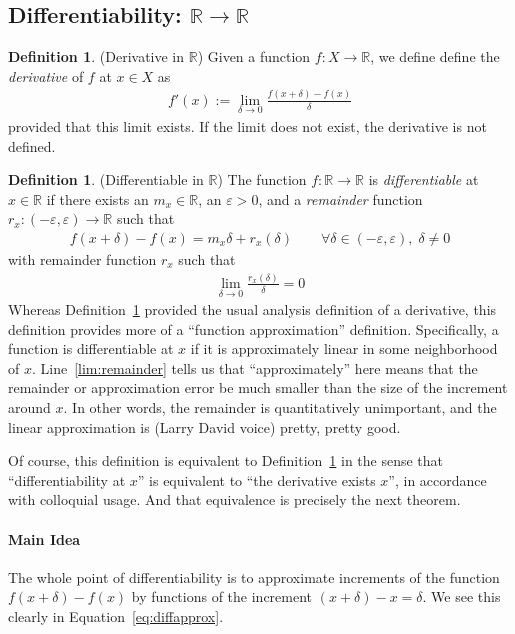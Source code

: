 \documentclass[12pt]{article}
\numberwithin{equation}{section} %
\theoremstyle{plain}
\theoremstyle{definition}
\newtheorem{defn}[thm]{Definition}
\theoremstyle{remark}
\newcommand{\R}{\mathbb{R}}
\begin{document}
\subsection{Differentiability: $\R\rightarrow\R$}

\begin{defn}{(Derivative in $\R$)}
\label{defn:derivative}
Given a function $f:X\rightarrow\R$, we define define the
\emph{derivative} of $f$ at $x\in X$ as
\begin{align*}
  f'(x) := \lim_{\delta\rightarrow0}
  \frac{f(x+\delta)-f(x)}{\delta}
\end{align*}
provided that this limit exists. If the limit does not exist, the
derivative is not defined.
\end{defn}

\begin{defn}{(Differentiable in $\R$)}
\label{defn:diffable}
The function $f:\R\rightarrow\R$ is \emph{differentiable} at $x\in\R$ if
there exists an $m_x\in\R$, an $\varepsilon>0$, and a \emph{remainder}
function $r_x:(-\varepsilon,\varepsilon)\rightarrow\R$ such that
\begin{align}
  \label{eq:diffapprox}
  f(x+\delta)-f(x) = m_x \delta + r_x(\delta)
  \qquad \forall \delta\in(-\varepsilon,\varepsilon), \; \delta \neq 0
\end{align}
with remainder function $r_x$ such that
\begin{align}
  \label{lim:remainder}
  \lim_{\delta\rightarrow 0}
  \frac{r_x(\delta)}{\delta}=0
\end{align}
Whereas Definition~\ref{defn:derivative} provided the usual analysis
definition of a derivative, this definition provides more of a
``function approximation'' definition. Specifically, a function is
differentiable at $x$ if it is approximately linear in some neighborhood
of $x$.  Line~\ref{lim:remainder} tells us that ``approximately'' here
means that the remainder or approximation error be much smaller than
the size of the increment around $x$. In other words, the remainder is
quantitatively unimportant, and the linear approximation is (Larry David
voice) pretty, pretty good.

Of course, this definition is equivalent to
Definition~\ref{defn:derivative} in the sense that ``differentiability
at $x$'' is equivalent to ``the derivative exists $x$'', in accordance
with colloquial usage. And that equivalence is precisely the next
theorem.
\end{defn}

\paragraph{Main Idea} The whole point of differentiability is to
approximate increments of the function $f(x+\delta)-f(x)$ by functions
of the increment $(x+\delta)-x=\delta$. We see this clearly in
Equation~\ref{eq:diffapprox}.
\end{document}
